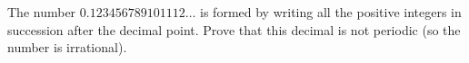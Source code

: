 The number $0.123456789101112\ldots$ is formed by writing all the positive integers in succession after the decimal point. Prove that this decimal is not periodic (so the number is irrational).
